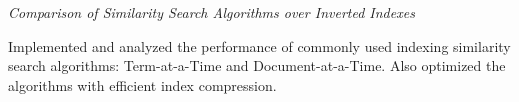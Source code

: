 \documentclass[10pt]{article}
\newcommand{\spc}{\vspace{1mm}}
\begin{document}
\textit{Comparison of Similarity Search Algorithms over Inverted Indexes}
\begin{compactitem}
\item {Implemented and analyzed the performance of commonly used indexing similarity search algorithms: Term-at-a-Time and Document-at-a-Time. Also optimized the algorithms  with efficient index compression.}
\end{compactitem}
\spc




\end{document}
